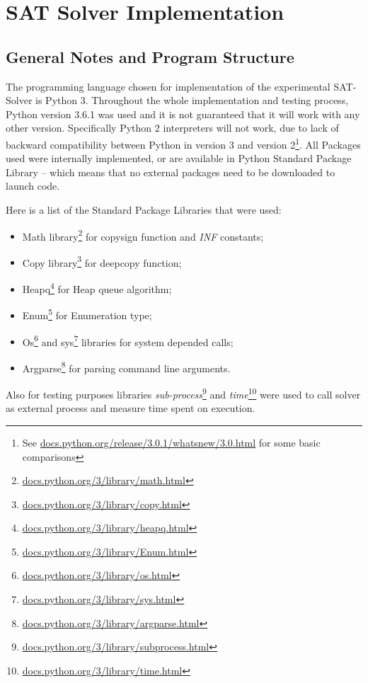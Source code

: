 \documentclass[12pt,english,pdflatex]{aghdpl}
\begin{document}
\chapter{SAT Solver Implementation}
\label{chap:Impl-4}

\section{General Notes and Program Structure}
\label{sec:ProgramStructure}

The programming language chosen for implementation of the experimental
SAT-Solver is Python 3. Throughout the whole implementation and testing process,
Python version 3.6.1 was used and it is not guaranteed that it
will work with any other version. Specifically Python 2 interpreters
will not work, due to lack of backward compatibility between Python
in version 3 and version 2\footnote{See \url{docs.python.org/release/3.0.1/whatsnew/3.0.html} for some basic comparisons}. All Packages used were internally implemented,
or are available in Python Standard Package Library -- which means
that no external packages need to be downloaded to launch code.

Here is a list of the Standard Package Libraries that were used:
\begin{itemize}
\item Math library\footnote{\url{docs.python.org/3/library/math.html}} for copysign function and \textit{INF} constants;
\item Copy library\footnote{\url{docs.python.org/3/library/copy.html}} for deepcopy function;
\item Heapq\footnote{\url{docs.python.org/3/library/heapq.html}} for Heap queue algorithm;
\item Enum\footnote{\url{docs.python.org/3/library/Enum.html}} for Enumeration type;
\item Os\footnote{\url{docs.python.org/3/library/os.html}} and sys\footnote{\url{docs.python.org/3/library/sys.html}} libraries for system depended calls;
\item Argparse\footnote{\url{docs.python.org/3/library/argparse.html}} for parsing command line arguments.
\end{itemize}
Also for testing purposes libraries \textit{sub-process}\footnote{\url{docs.python.org/3/library/subprocess.html}} and \textit{time}\footnote{\url{docs.python.org/3/library/time.html}} were used
to call solver as external process and measure time spent on execution.
\end{document}
